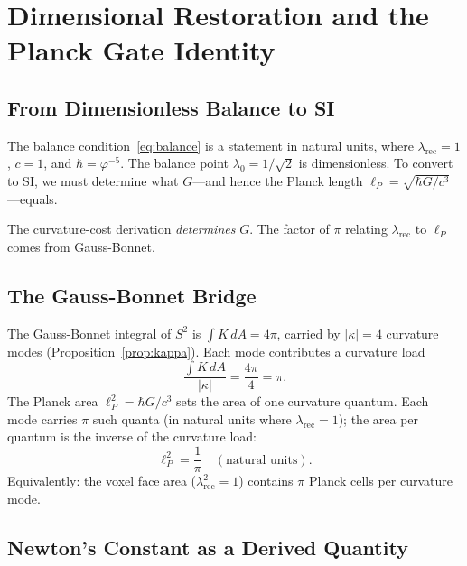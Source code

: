 \documentclass[12pt]{article}
\theoremstyle{definition}
\theoremstyle{remark}
\begin{document}
\section{Dimensional Restoration and the Planck Gate Identity}
\label{sec:dim-restore}

\subsection{From Dimensionless Balance to SI}

The balance condition~\eqref{eq:balance} is a statement in natural
units, where $\lambda_{\mathrm{rec}} = 1$, $c = 1$, and
$\hbar = \varphi^{-5}$. The balance point $\lambda_0 = 1/\sqrt{2}$
is dimensionless. To convert to SI, we must determine what $G$---and
hence the Planck length $\ell_P = \sqrt{\hbar G/c^3}$---equals.

The curvature-cost derivation \emph{determines} $G$. The factor of
$\pi$ relating $\lambda_{\mathrm{rec}}$ to $\ell_P$ comes from
Gauss-Bonnet.

\subsection{The Gauss-Bonnet Bridge}
\label{sec:GB-bridge}

The Gauss-Bonnet integral of $S^2$ is
$\int K\,dA = 4\pi$, carried by $|\kappa| = 4$ curvature modes
(Proposition~\ref{prop:kappa}). Each mode contributes a curvature
load
\begin{equation}
  \frac{\int K\,dA}{|\kappa|}
  = \frac{4\pi}{4} = \pi.
  \label{eq:GB-per-mode}
\end{equation}
The Planck area $\ell_P^2 = \hbar G/c^3$ sets the area of one
curvature quantum. Each mode carries $\pi$ such quanta (in natural
units where $\lambda_{\mathrm{rec}} = 1$); the area per quantum is
the inverse of the curvature load:
\begin{equation}
  \ell_P^2 = \frac{1}{\pi}
  \quad(\text{natural units}).
  \label{eq:ell-P-RS}
\end{equation}
Equivalently: the voxel face area ($\lambda_{\mathrm{rec}}^2 = 1$)
contains $\pi$ Planck cells per curvature mode.

\subsection{Newton's Constant as a Derived Quantity}
\label{sec:G-derived}
\end{document}

